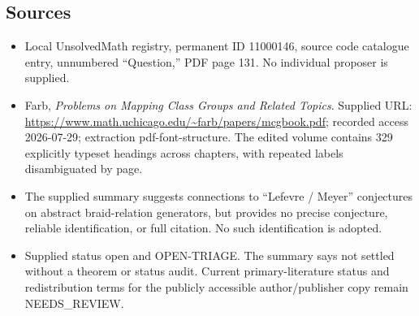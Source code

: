 \documentclass[11pt]{article}
\begin{document}
\subsection{Sources}
\begin{itemize}
\item Local UnsolvedMath registry, permanent ID 11000146, source code catalogue entry, unnumbered ``Question,'' PDF page 131. No individual proposer is supplied.
\item Farb, \emph{Problems on Mapping Class Groups and Related Topics}. Supplied URL: \url{https://www.math.uchicago.edu/~farb/papers/mcgbook.pdf}; recorded access 2026-07-29; extraction pdf-font-structure. The edited volume contains 329 explicitly typeset headings across chapters, with repeated labels disambiguated by page.
\item The supplied summary suggests connections to ``Lefevre / Meyer'' conjectures on abstract braid-relation generators, but provides no precise conjecture, reliable identification, or full citation. No such identification is adopted.
\item Supplied status open and OPEN-TRIAGE. The summary says not settled without a theorem or status audit. Current primary-literature status and redistribution terms for the publicly accessible author/publisher copy remain NEEDS\_REVIEW.
\end{itemize}
\end{document}
